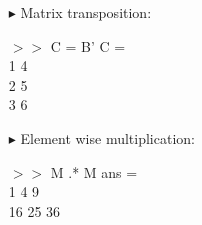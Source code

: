 \documentclass[xcolor={dvipsnames,rgb}, aspectratio=169]{beamer}
\begin{document}
\begin{frame}{}
    \begin{columns}
        \begin{itemize}
            \item[$\blacktriangleright$] Matrix transposition:
                  \begin{tcolorbox}[colback=white,colframe=bluepoli]
                      $>>$ C = B'
                      \tcblower
                      C = \\
                      \hspace{3em} 1 \hspace{3em} 4 \\
                      \hspace{3em} 2 \hspace{3em} 5 \\
                      \hspace{3em} 3 \hspace{3em} 6
                  \end{tcolorbox}

                  \vspace{-10pt}
            \item[$\blacktriangleright$] Element wise multiplication:
                  \begin{tcolorbox}[colback=white,colframe=bluepoli]
                      $>>$ M .* M
                      \tcblower
                      ans = \\
                      \hspace{3em} 1 \hspace{3em} 4  \hspace{3em} 9\\
                      \hspace{3em} 16 \hspace{3em} 25 \hspace{3em} 36
                  \end{tcolorbox}
        \end{itemize}


\end{columns}
\end{frame}
\end{document}
